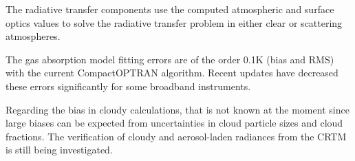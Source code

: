 \documentclass[10pt,letterpaper]{article}
\begin{document}
The radiative transfer components use the computed atmospheric and surface optics values to solve the radiative transfer problem in either clear or scattering atmospheres.

The gas absorption model fitting errors are of the order 0.1K (bias and RMS) with the current CompactOPTRAN algorithm. Recent updates have decreased these errors significantly for some broadband instruments. 

Regarding the bias in cloudy calculations, that is not known at the moment since large biases can be expected from uncertainties in cloud particle sizes and cloud fractions. The verification of cloudy and aerosol-laden radiances from the CRTM is still being investigated.


%
%
\end{document}
